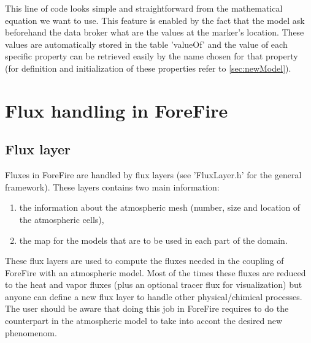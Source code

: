 This line of code looks simple and straightforward from the mathematical equation we want to use. This feature is enabled by the fact that the model ask beforehand the data broker what are the values at the marker's location. These values are automatically stored in the table 'valueOf' and the value of each specific property can be retrieved easily by the name chosen for that property (for definition and initialization of these properties refer to \ref{sec:newModel}).



\chapter{Flux handling in ForeFire}

\section{Flux layer}

Fluxes in ForeFire are handled by flux layers (see 'FluxLayer.h' for the general framework). These layers contains two main information:
\begin{enumerate}
\item the information about the atmospheric mesh (number, size and location of the atmospheric cells),
\item the map for the models that are to be used in each part of the domain.
\end{enumerate}

These flux layers are used to compute the fluxes needed in the coupling of ForeFire with an atmospheric model. Most of the times these fluxes are reduced to the heat and vapor fluxes (plus an optional tracer flux for visualization) but anyone can define a new flux layer to handle other physical/chimical processes. The user should be aware that doing this job in ForeFire requires to do the counterpart in the atmospheric model to take into accont the desired new phenomenom.

\begin{center}
\end{center}


